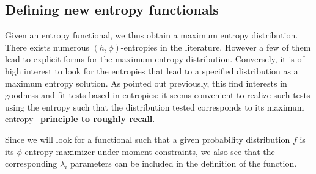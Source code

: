 \documentclass[english,sort&compress]{elsarticle}
\theoremstyle{definition}
\theoremstyle{plain}
\theoremstyle{plain}
\begin{document}

\subsection{Defining new entropy functionals}
\label{subsec:NewPhiEnt}

Given  an entropy  functional, we  thus obtain  a maximum  entropy distribution.
There exists numerous  $(h,\phi)$-entropies in the literature. However  a few of
them lead to  explicit forms for the maximum  entropy distribution.  Conversely,
it  is of  high interest  to look  for the  entropies that  lead to  a specified
distribution as a maximum entropy solution. As pointed out previously, this find
interests in goodness-and-fit  tests based in entropies: it  seems convenient to
realize  such  tests  using  the  entropy  such  that  the  distribution  tested
corresponds  to  its maximum  entropy~\cite{Vas76,  Gok83, Girardin}  {\bf\large
  principle to roughly recall}.

Since we will look for a  functional such that a given probability distribution
$f$ is its  $\phi$-entropy maximizer under moment constraints,  we also see that
the corresponding  $\lambda_i$ parameters can  be included in the  definition of
the function.
\end{document}
